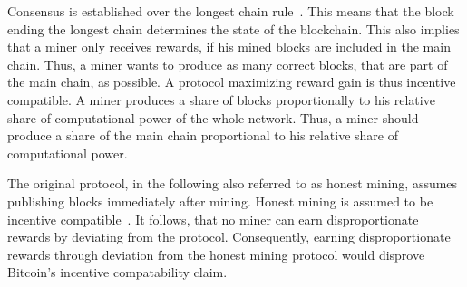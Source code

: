 Consensus is established over the longest chain rule~\cite{1}. This means that the block ending the longest chain determines the state of the blockchain. This also implies that a miner only receives rewards, if his mined blocks are included in the main chain. Thus, a miner wants to produce as many correct blocks, that are part of the main chain, as possible. A protocol maximizing reward gain is thus incentive compatible.
A miner produces a share of blocks proportionally to his relative share of computational power of the whole network. Thus, a miner should produce a share of the main chain proportional to his relative share of computational power.

The original protocol, in the following also referred to as honest mining, assumes publishing blocks immediately after mining. Honest mining is assumed to be incentive compatible~\cite{1}. It follows, that no miner can earn disproportionate rewards by deviating from the protocol.
Consequently, earning disproportionate rewards through deviation from the honest mining protocol would disprove Bitcoin's incentive compatability claim.

